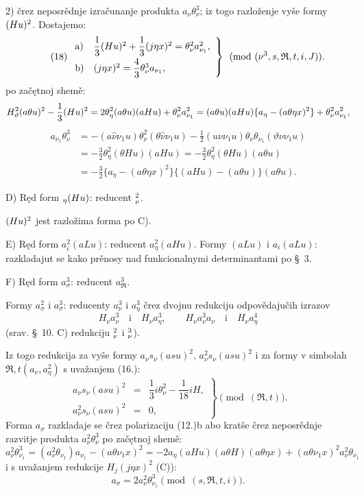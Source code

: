 \documentclass[11pt]{article}
\let\A\relax
\newcommand{\A}{\mathfrak A}
\newcommand{\R}{\mathfrak R}
\begin{document}
2) črez neposrědnje izračunanje produkta $a_\nu\theta_\nu^3$; iz togo razloženje vyše formy $(\A Hu)^2$. Dostajemo:
\[
\tag{18}
\left.\begin{array}{ll}
\mathrm{a)}&\dfrac13(\A Hu)^2+\dfrac13(j\eta x)^2=\theta_\nu^2a_{\nu_1}^2,\\[0.6em]
\mathrm{b)}&(j\eta x)^2=\dfrac43\theta_\nu^3a_{\nu_1},
\end{array}\right\}\pmod{(\nu^3,s,\R,t,i,J)}.
\]
po začętnoj shemě:
\[
H_\vartheta^2(a\theta u)^2-\frac13(\A Hu)^2
=2\theta_\eta^2(a\theta u)(aHu)+\theta_\nu^2a_{\nu_1}^2
=(a\theta u)(aHu)\{a_\eta-(a\theta\eta x)^2\}+\theta_\nu^2a_{\nu_1}^2,
\]
\[
\begin{aligned}
a_{\nu_1}\theta_\nu^3
&=-(a\widehat{\nu}\nu_1u)\theta_\nu^2(\theta\widehat{\nu}\nu_1u)
-\frac12(u\nu\nu_1u)\theta_\nu\theta_{\nu_1}(\vartheta\nu\nu_1u)\\
&=-\frac32\theta_\eta^2(\theta Hu)(aHu)
=-\frac32\theta_\eta^2(\theta Hu)(a\theta u)\\
&=-\frac32\{a_\eta-(a\theta\eta x)^2\}\{(aHu)-(a\theta u)\}(a\theta u).
\end{aligned}
\]

\noindent\mbox{D)} Ręd form $\A_\eta(\A Hu)$: reducent $\A_\nu^2$.

$(\A Hu)^2$ jest razložima forma po \mbox{C)}.

\noindent\mbox{E)} Ręd form $a_i^2(aLu)$: reducent $a_\eta^2(aHu)$. Formy $(aLu)$ i $a_i(aLu)$: razkladajut se kako prěnosy nad funkcionalnymi determinantami po \S\ 3.

\noindent\mbox{F)} Ręd form $a_\sigma^3$: reducent $a_\R^3$.

Formy $a_\sigma^2$ i $a_\sigma^3$: reducenty $a_\nu^3$ i $a_\eta^3$ črez dvojnu redukciju odpovědajučih izrazov
\[
H_\nu a_\nu^3\quad\text{i}\quad H_\nu a_\eta^3,
\qquad
H_\nu a_\nu^3a_\nu\quad\text{i}\quad H_\nu a_\eta^4
\]
(srav. \S\ 10. \mbox{C)} redukciju $\A_\nu^2$ i $\A_\nu^3$).

Iz togo redukcija za vyše formy $a_\nu s_\nu(asu)^2$, $a_\nu^2s_\nu(asu)^2$ i za formy v simbolah $\R,t(a_\nu,a_\eta^2)$ s uvažanjem (16.):
\[
\tag{19}
\left.\begin{array}{rcl}
a_\nu s_\nu(asu)^2&=&\dfrac13 i\theta_\nu^2-\dfrac1{18}iH,\\[0.5em]
a_\nu^2s_\nu(asu)^2&=&0,
\end{array}\right\}\pmod{(\R,t)}.
\]
Forma $a_\sigma$ razkladaje se črez polarizaciju (12.)\mbox{b} abo kratše črez neposrědnje razvitje produkta $a_\nu^2\theta_\nu^3$ po začętnoj shemě:
\[
a_\nu^2\theta_{\nu_1}^3=(a_\nu^2\theta_{\nu_1})a_{\nu_1}-(a\theta\nu_1x)^2
=-2a_\eta(aHu)(a\theta H)(a\theta\eta x)+(a\theta\nu_1x)^2a_\nu^2\theta_{\nu_1}
\]
i s uvažanjem redukcije $H_j(j\eta x)^2$ (\mbox{C)}):
\[
\tag{20}
a_\sigma=2a_\nu^2\theta_{\nu_1}^3\pmod{(s,\R,t,i)}.
\]
\end{document}
